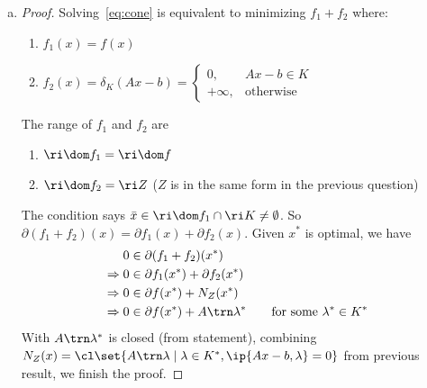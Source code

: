\documentclass{article}
\theoremstyle{plain}
\theoremstyle{definition}
\theoremstyle{remark}
\begin{document}
\begin{solution}
\begin{enumerate}[(a)]
{\begin{proof}
                We conclude that
                \[ \text{ri}\, Z \supseteq \{x \in \mathbb{R}^n \mid Ax - b \in \text{ri}\, K\}. \]
            \end{proof}
        }
        \item {
            \begin{proof}
                Solving~\cref{eq:cone} is equivalent to minimizing $f_1+f_2$ where:
                \begin{enumerate}
                    \item $f_1(x)=f(x)$
                    \item $f_2(x)=\delta_K(Ax-b)=\begin{cases}
                        0, & Ax-b\in K \\
                        +\infty, & \text{otherwise}
                    \end{cases}$
                \end{enumerate}
                The range of $f_1$ and $f_2$ are
                \begin{enumerate}
                    \item $\ri\dom f_1=\ri\dom f$
                    \item $\ri\dom f_2=\ri Z$ ($Z$ is in the same form in the previous question)
                \end{enumerate}
                The condition says $\bar{x}\in\ri\dom f_1\cap\ri K\neq\emptyset$. So $\partial(f_1+f_2)(x)=\partial f_1(x)+\partial f_2(x)$. Given $x^*$ is optimal, we have
                \begin{align*}
                    0& \in\partial(f_1+f_2)(x^*) \\
                    \Rightarrow
                    0& \in\partial f_1(x^*)+\partial f_2(x^*) \\
                    \Rightarrow
                    0& \in\partial f(x^*)+N_Z(x^*) \\
                    \Rightarrow
                    0& \in\partial f(x^*)+A\trn\lambda^* \qquad \text{for some }\lambda^*\in K^*
                \end{align*}
                With $A\trn\lambda^*$ is closed (from statement), combining $N_Z(x)=\cl\set{A\trn\lambda\mid\lambda\in K^*,\ip{Ax-b,\lambda}=0}$ from previous result, we finish the proof.
            \end{proof}
        }
    \end{enumerate}
\end{solution}
\end{document}
